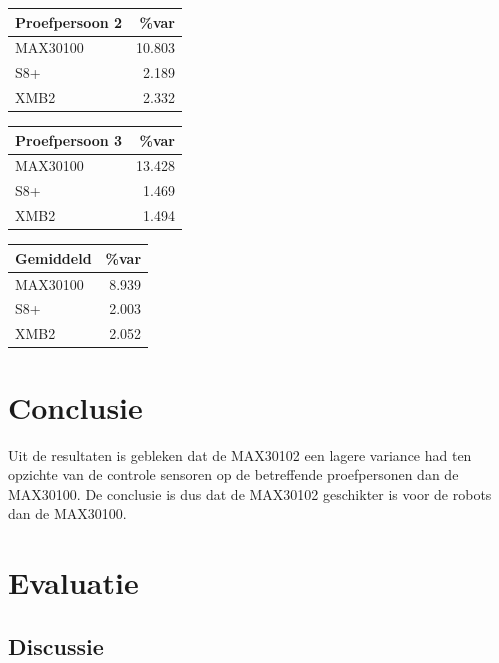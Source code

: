 \documentclass[11pt]{article}
\begin{document}
	\begin{table}[H]
	\begin{tabular}{l|r}
\textbf{Proefpersoon 2}  & \%var  \\
	\hline
	MAX30100	& 10.803  \\
	S8+		& 2.189  \\
	XMB2		& 2.332  \\
	\end{tabular}
	\end{table}



	\begin{table}[H]
	\begin{tabular}{l|r}
\textbf{Proefpersoon 3}  & \%var  \\
	\hline
	MAX30100	& 13.428  \\
	S8+		& 1.469  \\
	XMB2		& 1.494  \\
	\end{tabular}
	\end{table}


	\begin{table}[H]
	\begin{tabular}{l|r}
		\textbf{Gemiddeld}\hspace{0.8cm}  & \%var  \\
	\hline
	MAX30100	& 8.939  \\
	S8+		& 2.003  \\
	XMB2		& 2.052  \\
	\end{tabular}
	\end{table}


    \section{Conclusie}\label{sec:conclusie}
Uit de resultaten is gebleken dat de MAX30102 een lagere variance had ten opzichte van de controle sensoren op de betreffende proefpersonen dan de MAX30100. De conclusie is dus dat de MAX30102 geschikter is voor de robots dan de MAX30100.

	
    \section{Evaluatie}\label{sec:evaluatie}
    \subsection{Discussie}\label{subsec:discussie}
\end{document}
